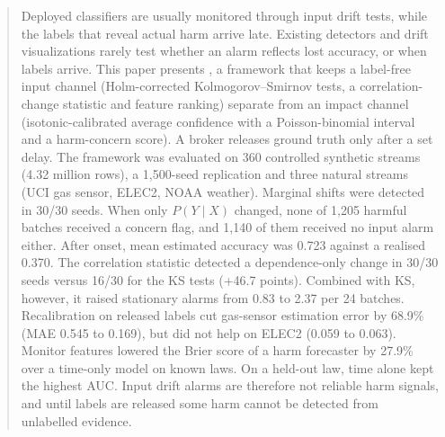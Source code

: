 \begin{abstract}
Deployed classifiers are usually monitored through input drift tests, while the labels
that reveal actual harm arrive late. Existing detectors and drift visualizations rarely
test whether an alarm reflects lost accuracy, or when labels arrive. This paper presents \idm{}, a framework that keeps a
label-free input channel (Holm-corrected Kolmogorov--Smirnov tests, a correlation-change
statistic and feature ranking) separate from an impact channel (isotonic-calibrated
average confidence with a Poisson-binomial interval and a harm-concern score). A broker
releases ground truth only after a set delay. The framework was evaluated on 360 controlled synthetic
streams (4.32 million rows), a 1,500-seed replication and three natural streams (UCI
gas sensor, ELEC2, NOAA weather). Marginal shifts were detected in 30/30 seeds. When
only $P(Y\mid X)$ changed, none of 1,205 harmful batches received a concern flag, and
1,140 of them received no input alarm either. After onset, mean estimated accuracy was
0.723 against a realised 0.370. The correlation statistic detected a dependence-only
change in 30/30 seeds versus 16/30 for the KS tests (+46.7 points). Combined with KS,
however, it raised stationary alarms from 0.83 to 2.37 per 24 batches. Recalibration on
released labels cut gas-sensor estimation error by 68.9\% (MAE 0.545 to 0.169), but did
not help on ELEC2 (0.059 to 0.063). Monitor features lowered the Brier score of a harm
forecaster by 27.9\% over a time-only model on known laws. On a held-out law, time alone
kept the highest AUC. Input drift alarms are therefore not reliable harm signals, and
until labels are released some harm cannot be detected from unlabelled evidence.
\end{abstract}
